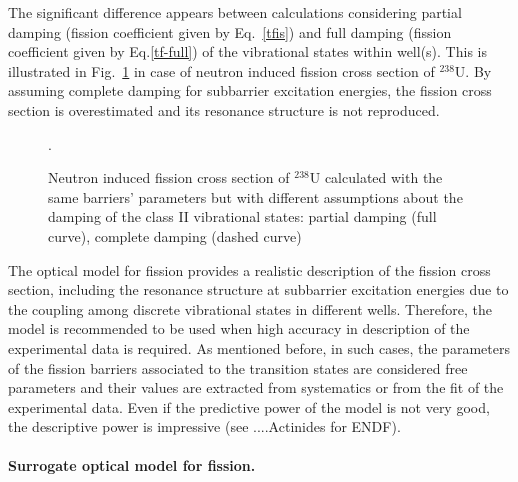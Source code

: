 The significant difference appears between calculations considering partial
damping (fission coefficient given by Eq.~\ref{tfis}) and full damping
(fission coefficient given by Eq.\ref{tf-full}) of the vibrational states
within well(s). This is illustrated in Fig.~\ref{fis-u38-fcom} in case of
neutron induced fission cross section of $^{238}$U. By assuming complete
damping for subbarrier excitation energies, the fission cross section is
overestimated and its resonance structure is not reproduced.
\begin{figure}[htbp]
 .
\caption{Neutron induced fission cross section of $^{238}$U calculated with
the same barriers' parameters but with different assumptions about the
damping of the class II vibrational states: partial damping (full curve),
complete damping (dashed curve)}
\label{fis-u38-fcom}
\end{figure}

The optical model for fission provides a realistic description of the
fission cross section, including the resonance structure at subbarrier
excitation energies due to the coupling among discrete vibrational states in
different wells. Therefore, the model is recommended to be used when high
accuracy in description of the experimental data is required. As mentioned
before, in such cases, the parameters of the fission barriers associated to
the transition states are considered free parameters and their values are
extracted from systematics or from the fit of the experimental data. Even if
the predictive power of the model is not very good, the descriptive power is
impressive (see ....Actinides for ENDF).

\medskip %

\paragraph*{Surrogate optical model for fission.}

